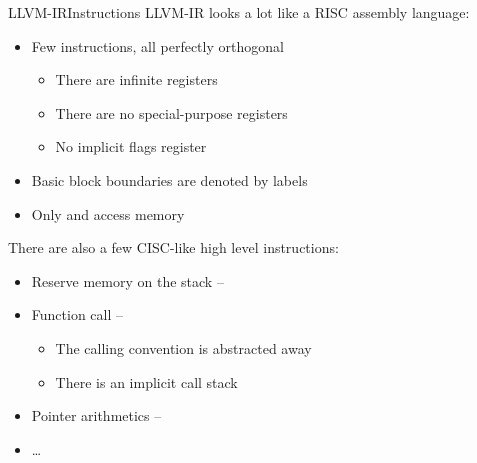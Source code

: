 \begin{frame}{LLVM-IR}{Instructions}
LLVM-IR looks a lot like a RISC assembly language:\\

\begin{itemize}
\item Few instructions, all perfectly orthogonal
	\begin{itemize}
	\item There are infinite registers
	\item There are no special-purpose registers
	\item No implicit flags register
	\end{itemize}
\item Basic block boundaries are denoted by \alert{labels}
\item Only  and  access memory
\end{itemize}

\vfill
There are also a few CISC-like \alert{high level instructions}:

\begin{itemize}
\item Reserve memory on the stack -- 
\item Function call -- 
	\begin{itemize}
	\item The calling convention is abstracted away
	\item There is an implicit call stack
	\end{itemize}
\item Pointer arithmetics -- 
\item \ldots
\end{itemize}
\end{frame}


